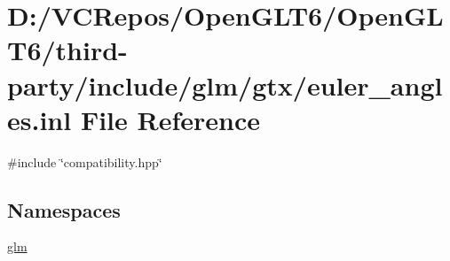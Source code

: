 \hypertarget{euler__angles_8inl}{}\section{D\+:/\+V\+C\+Repos/\+Open\+G\+L\+T6/\+Open\+G\+L\+T6/third-\/party/include/glm/gtx/euler\+\_\+angles.inl File Reference}
\label{euler__angles_8inl}
{\ttfamily \#include \char`\"{}compatibility.\+hpp\char`\"{}}\newline
\subsection*{Namespaces}
\begin{DoxyCompactItemize}
\item 
 \mbox{\hyperlink{namespaceglm}{glm}}
\end{DoxyCompactItemize}
